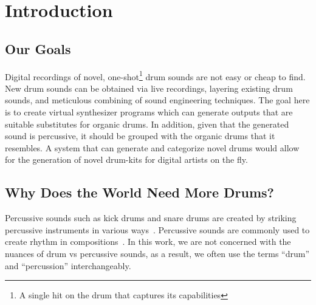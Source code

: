 \documentclass[\main/thesis.tex]{subfiles}
\begin{document}
\chapter{Introduction}


\section{Our Goals}
Digital recordings of novel, one-shot\footnote{A single hit on the drum that captures its capabilities} drum sounds are not easy or cheap to find. New drum sounds can be obtained via live recordings, layering existing drum sounds, and meticulous combining of sound engineering techniques. The goal here is to create virtual synthesizer programs which can generate outputs that are suitable substitutes for organic drums. In addition, given that the generated sound is percussive, it should be grouped with the organic drums that it resembles. A system that can generate and categorize novel drums would allow for the generation of novel drum-kits for digital artists on the fly. 


\section{Why Does the World Need More Drums?}
Percussive sounds such as kick drums and snare drums are created by striking percussive instruments in various ways~\cite{barry2005drum}. Percussive sounds are commonly used to create rhythm in compositions~\cite{needham1967percussion}. In this work, we are not concerned with the nuances of drum vs percussive sounds, as a result, we often use the terms \enquote{drum} and \enquote{percussion} interchangeably.
\end{document}
